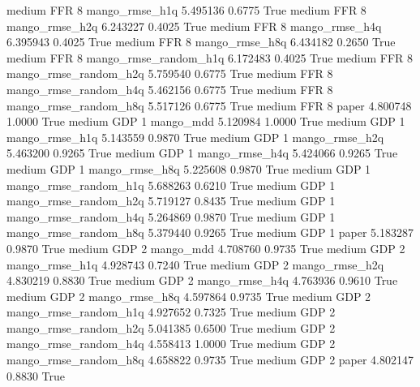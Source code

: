     medium      FFR                 8        mango_rmse_h1q   5.495136      0.6775    True
    medium      FFR                 8        mango_rmse_h2q   6.243227      0.4025    True
    medium      FFR                 8        mango_rmse_h4q   6.395943      0.4025    True
    medium      FFR                 8        mango_rmse_h8q   6.434182      0.2650    True
    medium      FFR                 8 mango_rmse_random_h1q   6.172483      0.4025    True
    medium      FFR                 8 mango_rmse_random_h2q   5.759540      0.6775    True
    medium      FFR                 8 mango_rmse_random_h4q   5.462156      0.6775    True
    medium      FFR                 8 mango_rmse_random_h8q   5.517126      0.6775    True
    medium      FFR                 8                 paper   4.800748      1.0000    True
    medium      GDP                 1             mango_mdd   5.120984      1.0000    True
    medium      GDP                 1        mango_rmse_h1q   5.143559      0.9870    True
    medium      GDP                 1        mango_rmse_h2q   5.463200      0.9265    True
    medium      GDP                 1        mango_rmse_h4q   5.424066      0.9265    True
    medium      GDP                 1        mango_rmse_h8q   5.225608      0.9870    True
    medium      GDP                 1 mango_rmse_random_h1q   5.688263      0.6210    True
    medium      GDP                 1 mango_rmse_random_h2q   5.719127      0.8435    True
    medium      GDP                 1 mango_rmse_random_h4q   5.264869      0.9870    True
    medium      GDP                 1 mango_rmse_random_h8q   5.379440      0.9265    True
    medium      GDP                 1                 paper   5.183287      0.9870    True
    medium      GDP                 2             mango_mdd   4.708760      0.9735    True
    medium      GDP                 2        mango_rmse_h1q   4.928743      0.7240    True
    medium      GDP                 2        mango_rmse_h2q   4.830219      0.8830    True
    medium      GDP                 2        mango_rmse_h4q   4.763936      0.9610    True
    medium      GDP                 2        mango_rmse_h8q   4.597864      0.9735    True
    medium      GDP                 2 mango_rmse_random_h1q   4.927652      0.7325    True
    medium      GDP                 2 mango_rmse_random_h2q   5.041385      0.6500    True
    medium      GDP                 2 mango_rmse_random_h4q   4.558413      1.0000    True
    medium      GDP                 2 mango_rmse_random_h8q   4.658822      0.9735    True
    medium      GDP                 2                 paper   4.802147      0.8830    True
